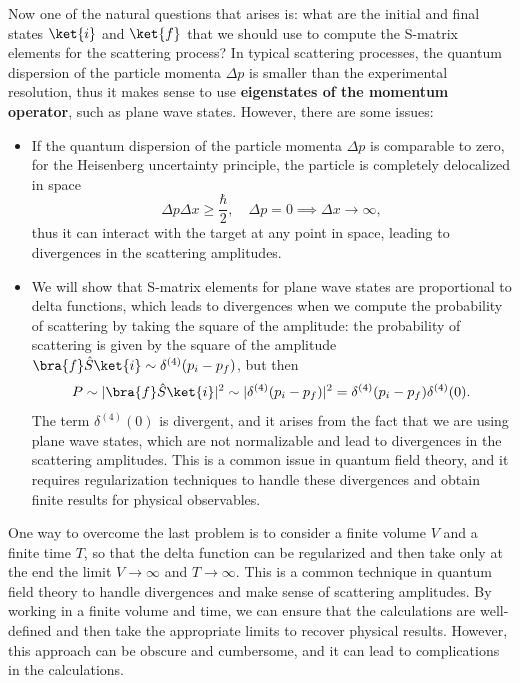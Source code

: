 Now one of the natural questions that arises is: what are the initial and final states \(\ket{i}\) and \(\ket{f}\) that we should use to compute the S-matrix elements for the scattering process? In typical scattering processes, the quantum dispersion of the particle momenta \(\Delta p\) is smaller than the experimental resolution, thus it makes sense to use \textbf{eigenstates of the momentum operator}, such as plane wave states. However, there are some issues:
\begin{itemize}
    \item If the quantum dispersion of the particle momenta \(\Delta p\) is comparable to zero, for the Heisenberg uncertainty principle, the particle is completely delocalized in space
          \[
              \Delta p \Delta x \geq \frac{\hbar}{2}, \quad \Delta p = 0 \implies \Delta x \to \infty,
          \]
          thus it can interact with the target at any point in space, leading to divergences in the scattering amplitudes.
    \item We will show that S-matrix elements for plane wave states are proportional to delta functions, which leads to divergences when we compute the probability of scattering by taking the square of the amplitude: the probability of scattering is given by the square of the amplitude \(\bra{f} \hat{S} \ket{i} \sim \delta^{(4)}(p_i - p_f)\), but then
          \[
              P \sim |\bra{f} \hat{S} \ket{i}|^2 \sim |\delta^{(4)}(p_i - p_f)|^2 = \delta^{(4)}(p_i - p_f) \delta^{(4)}(0).
          \]
          The term \(\delta^{(4)}(0)\) is divergent, and it arises from the fact that we are using plane wave states, which are not normalizable and lead to divergences in the scattering amplitudes. This is a common issue in quantum field theory, and it requires regularization techniques to handle these divergences and obtain finite results for physical observables.
\end{itemize}

One way to overcome the last problem is to consider a finite volume \(V\) and a finite time \(T\), so that the delta function can be regularized and then take only at the end the limit \(V \to \infty\) and \(T \to \infty\). This is a common technique in quantum field theory to handle divergences and make sense of scattering amplitudes. By working in a finite volume and time, we can ensure that the calculations are well-defined and then take the appropriate limits to recover physical results. However, this approach can be obscure and cumbersome, and it can lead to complications in the calculations.

